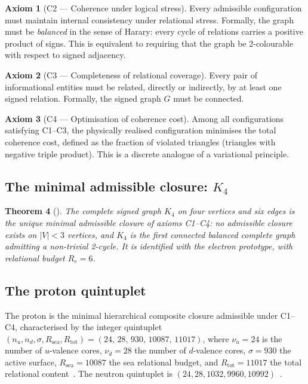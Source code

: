 \documentclass[11pt,a4paper]{article}
\theoremstyle{plain}
\newtheorem{theorem}{Theorem}[section]
\theoremstyle{definition}
\newtheorem{axiom}[theorem]{Axiom}
\theoremstyle{remark}
\newcommand{\quintuplet}{(24,\,28,\,930,\,10087,\,11017)}
\begin{document}
\begin{axiom}[C2 --- Coherence under logical stress]
Every admissible configuration must maintain internal consistency under relational stress. Formally, the graph must be \emph{balanced} in the sense of Harary: every cycle of relations carries a positive product of signs. This is equivalent to requiring that the graph be 2-colourable with respect to signed adjacency.
\end{axiom}

\begin{axiom}[C3 --- Completeness of relational coverage]
Every pair of informational entities must be related, directly or indirectly, by at least one signed relation. Formally, the signed graph $G$ must be connected.
\end{axiom}

\begin{axiom}[C4 --- Optimisation of coherence cost]
Among all configurations satisfying C1--C3, the physically realised configuration minimises the total coherence cost, defined as the fraction of violated triangles (triangles with negative triple product). This is a discrete analogue of a variational principle.
\end{axiom}

\subsection{The minimal admissible closure: \texorpdfstring{$K_4$}{K4}}
\label{subsec:K4}
\begin{theorem}[\cite{D16a}]
\label{thm:K4}
The complete signed graph $K_4$ on four vertices and six edges is the unique minimal admissible closure of axioms C1--C4: no admissible closure exists on $|V|<3$ vertices, and $K_4$ is the first connected balanced complete graph admitting a non-trivial 2-cycle. It is identified with the electron prototype, with relational budget $R_e=6$.
\end{theorem}

\subsection{The proton quintuplet}
\label{subsec:quintuplet}
The proton is the minimal hierarchical composite closure admissible under C1--C4, characterised by the integer quintuplet $(n_u, n_d, \sigma, R_{\mathrm{sea}}, R_{\mathrm{tot}}) = \quintuplet$, where $\nu_u=24$ is the number of $u$-valence cores, $\nu_d=28$ the number of $d$-valence cores, $\sigma=930$ the active surface, $R_{\mathrm{sea}}=10087$ the sea relational budget, and $R_{\mathrm{tot}}=11017$ the total relational content~\cite{D01,D16,D16a,D16b}. The neutron quintuplet is $(24,28,1032,9960,10992)$~\cite{D22}.
\end{document}
